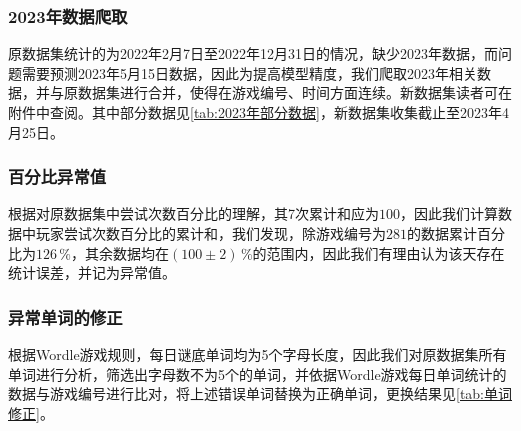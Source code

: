 \documentclass{MathModeling}
\begin{document}
	\subsubsection{2023年数据爬取}
	原数据集统计的为2022年2月7日至2022年12月31日的情况，缺少2023年数据，而问题需要预测2023年5月15日数据，因此为提高模型精度，我们爬取2023年相关数据，并与原数据集进行合并，使得在游戏编号、时间方面连续。新数据集读者可在附件中查阅。其中部分数据见\textcolor{blue}{\cref{tab:2023年部分数据}}，新数据集收集截止至2023年4月25日。
\begin{table}[H]
	\centering
	\caption{2023年部分数据}
	\label{tab:2023年部分数据}
\end{table}

	\subsubsection{百分比异常值}
	根据对原数据集中尝试次数百分比的理解，其7次累计和应为$100$，因此我们计算数据中玩家尝试次数百分比的累计和，我们发现，除游戏编号为$281$的数据累计百分比为$126\,\%$，其余数据均在$\left(100\pm2\right)\,\%$的范围内，因此我们有理由认为该天存在统计误差，并记为异常值。

	\subsubsection{异常单词的修正}
	根据Wordle游戏规则，每日谜底单词均为5个字母长度，因此我们对原数据集所有单词进行分析，筛选出字母数不为5个的单词，并依据Wordle游戏每日单词统计的数据与游戏编号进行比对，将上述错误单词替换为正确单词，更换结果见\textcolor{blue}{\cref{tab:单词修正}}。
\begin{table}[H]
	\centering
	\caption{单词修正}
	\label{tab:单词修正}
\end{table}
  
\end{document}
